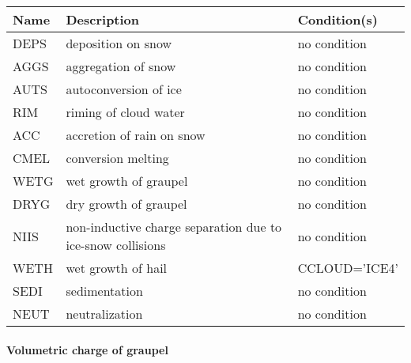 \begin{longtable} {|p{}|p{}|p{}|}
\hline
Name & Description & Condition(s) \\
\hline \hline
\endhead
DEPS   & deposition on snow        & no condition \\\hline
AGGS   & aggregation of snow       & no condition \\\hline
AUTS   & autoconversion of ice     & no condition \\\hline
RIM    & riming of cloud water     & no condition \\\hline
ACC    & accretion of rain on snow & no condition \\\hline
CMEL   & conversion melting        & no condition \\\hline
WETG   & wet growth of graupel     & no condition \\\hline
DRYG   & dry growth of graupel     & no condition \\\hline
NIIS   & non-inductive charge separation due to ice-snow collisions & no condition \\\hline
WETH   & wet growth of hail        & CCLOUD='ICE4' \\\hline
SEDI   & sedimentation             & no condition \\\hline
NEUT   & neutralization            & no condition \\\hline
\end{longtable}

\paragraph{Volumetric charge of graupel}
\mbox{} %

